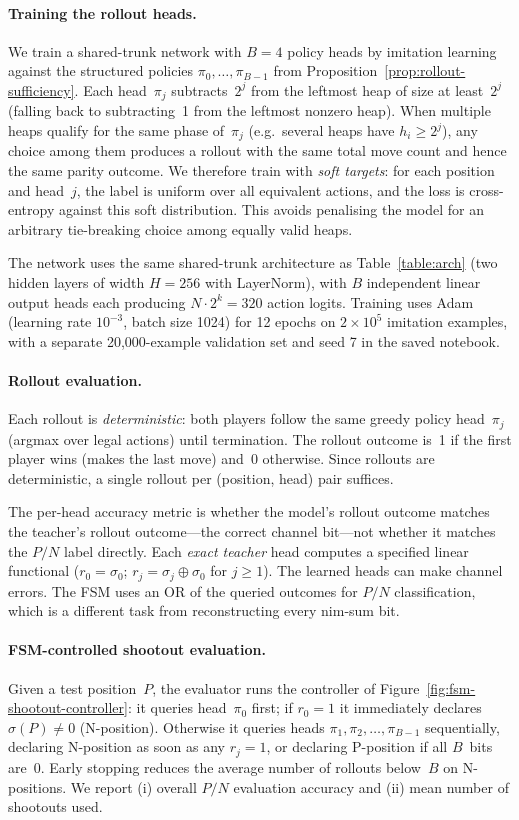 \documentclass[11pt]{article}
\theoremstyle{plain}
\theoremstyle{definition}
\theoremstyle{remark}
\numberwithin{equation}{section}
\begin{document}
\paragraph{Training the rollout heads.}
We train a shared-trunk network with $B=4$ policy heads by imitation learning against the structured policies $\pi_0,\dots,\pi_{B-1}$ from Proposition~\ref{prop:rollout-sufficiency}.
Each head~$\pi_j$ subtracts~$2^j$ from the leftmost heap of size at least~$2^j$ (falling back to subtracting~1 from the leftmost nonzero heap).
When multiple heaps qualify for the same phase of~$\pi_j$ (e.g.\ several heaps have $h_i \geq 2^j$), any choice among them produces a rollout with the same total move count and hence the same parity outcome.
We therefore train with \emph{soft targets}: for each position and head~$j$, the label is uniform over all equivalent actions, and the loss is cross-entropy against this soft distribution.
This avoids penalising the model for an arbitrary tie-breaking choice among equally valid heaps.

The network uses the same shared-trunk architecture as Table~\ref{table:arch} (two hidden layers of width $H=256$ with LayerNorm), with $B$ independent linear output heads each producing $N \cdot 2^k = 320$ action logits.
Training uses Adam (learning rate $10^{-3}$, batch size 1024) for 12 epochs on $2\times10^5$ imitation examples, with a separate 20,000-example validation set and seed 7 in the saved notebook.

\paragraph{Rollout evaluation.}
Each rollout is \emph{deterministic}: both players follow the same greedy policy head~$\pi_j$ (argmax over legal actions) until termination.
The rollout outcome is~1 if the first player wins (makes the last move) and~0 otherwise.
Since rollouts are deterministic, a single rollout per (position, head) pair suffices.

The per-head accuracy metric is whether the model's rollout outcome matches the teacher's rollout outcome---the correct channel bit---not whether it matches the $P/N$ label directly.
Each \emph{exact teacher} head computes a specified linear functional ($r_0=\sigma_0$; $r_j=\sigma_j\oplus\sigma_0$ for $j\ge1$). The learned heads can make channel errors. The FSM uses an OR of the queried outcomes for $P/N$ classification, which is a different task from reconstructing every nim-sum bit.

\paragraph{FSM-controlled shootout evaluation.}
Given a test position~$P$, the evaluator runs the controller of Figure~\ref{fig:fsm-shootout-controller}:
it queries head~$\pi_0$ first; if $r_0 = 1$ it immediately declares $\sigma(P) \neq 0$ (N-position).
Otherwise it queries heads $\pi_1, \pi_2, \ldots, \pi_{B-1}$ sequentially, declaring N-position as soon as any $r_j = 1$, or declaring P-position if all $B$~bits are~0.
Early stopping reduces the average number of rollouts below~$B$ on N-positions.
We report (i) overall $P/N$ evaluation accuracy and (ii) mean number of shootouts used.
\end{document}
